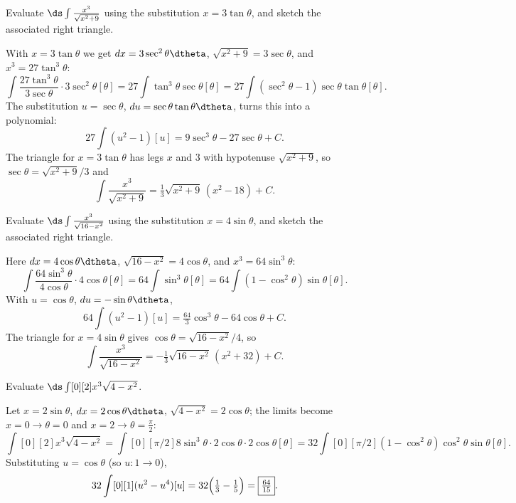 \begin{exercise}
	Evaluate $\ds \int{\frac{x^3}{\sqrt{x^2 + 9}}}$ using the substitution
	$x = 3\tan\theta$, and sketch the associated right triangle.
\end{exercise}
\begin{solution}[2.75in]
	With $x = 3\tan\theta$ we get $dx = 3\sec^2\theta\dtheta$,
	$\sqrt{x^2 + 9} = 3\sec\theta$, and $x^3 = 27\tan^3\theta$:
	\[
		\int{\frac{27\tan^3\theta}{3\sec\theta} \cdot 3\sec^2\theta}[\theta]
		   = 27\int{\tan^3\theta\sec\theta}[\theta]
		   = 27\int{(\sec^2\theta - 1)\sec\theta\tan\theta}[\theta].
	\]
	The substitution $u = \sec\theta$, $du = \sec\theta\tan\theta\dtheta$, turns
	this into a polynomial:
	\[
		27\int{(u^2 - 1)}[u]
		   = 9\sec^3\theta - 27\sec\theta + C.
	\]
	The triangle for $x = 3\tan\theta$ has legs $x$ and $3$ with hypotenuse
	$\sqrt{x^2 + 9}$, so $\sec\theta = \sqrt{x^2 + 9}/3$ and
	\[
		\int{\frac{x^3}{\sqrt{x^2 + 9}}}
		   = \boxed{\tfrac13\sqrt{x^2 + 9}\,(x^2 - 18) + C}.
	\]
\end{solution}

\begin{exercise}
	Evaluate $\ds \int{\frac{x^3}{\sqrt{16 - x^2}}}$ using the substitution
	$x = 4\sin\theta$, and sketch the associated right triangle.
\end{exercise}
\begin{solution}[2.75in]
	Here $dx = 4\cos\theta\dtheta$, $\sqrt{16 - x^2} = 4\cos\theta$, and
	$x^3 = 64\sin^3\theta$:
	\[
		\int{\frac{64\sin^3\theta}{4\cos\theta} \cdot 4\cos\theta}[\theta]
		   = 64\int{\sin^3\theta}[\theta]
		   = 64\int{(1 - \cos^2\theta)\sin\theta}[\theta].
	\]
	With $u = \cos\theta$, $du = -\sin\theta\dtheta$,
	\[
		64\int{(u^2 - 1)}[u]
		   = \tfrac{64}{3}\cos^3\theta - 64\cos\theta + C.
	\]
	The triangle for $x = 4\sin\theta$ gives $\cos\theta = \sqrt{16 - x^2}/4$, so
	\[
		\int{\frac{x^3}{\sqrt{16 - x^2}}}
		   = \boxed{-\tfrac13\sqrt{16 - x^2}\,(x^2 + 32) + C}.
	\]
\end{solution}

\begin{exercise}
	Evaluate $\ds \int[0][2]{x^3\sqrt{4 - x^2}}$.
\end{exercise}
\begin{solution}[2.75in]
	Let $x = 2\sin\theta$, $dx = 2\cos\theta\dtheta$, $\sqrt{4 - x^2} = 2\cos\theta$;
	the limits become $x = 0 \to \theta = 0$ and $x = 2 \to \theta = \tfrac{\pi}{2}$:
	\[
		\int[0][2]{x^3\sqrt{4 - x^2}}
		   = \int[0][\pi/2]{8\sin^3\theta \cdot 2\cos\theta \cdot 2\cos\theta}[\theta]
		   = 32\int[0][\pi/2]{(1 - \cos^2\theta)\cos^2\theta\sin\theta}[\theta].
	\]
	Substituting $u = \cos\theta$ (so $u : 1 \to 0$),
	\[
		32\int[0][1]{(u^2 - u^4)}[u]
		   = 32\Bigl(\tfrac13 - \tfrac15\Bigr)
		   = \boxed{\tfrac{64}{15}}.
	\]
\end{solution}

